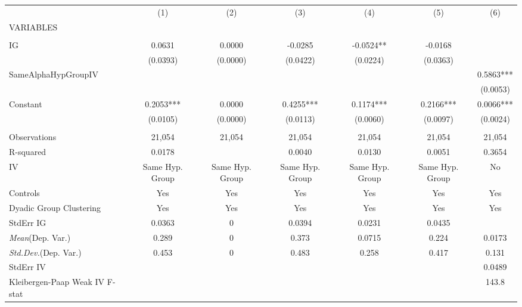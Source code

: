 \documentclass[]{article}
\begin{document}
\begin{tabular}{lcccccc} \hline
 & (1) & (2) & (3) & (4) & (5) & (6) \\
VARIABLES &  &  &  &  &  &  \\ \hline
 &  &  &  &  &  &  \\
IG & 0.0631 & 0.0000 & -0.0285 & -0.0524** & -0.0168 &  \\
 & (0.0393) & (0.0000) & (0.0422) & (0.0224) & (0.0363) &  \\
SameAlphaHypGroupIV &  &  &  &  &  & 0.5863*** \\
 &  &  &  &  &  & (0.0053) \\
Constant & 0.2053*** & 0.0000 & 0.4255*** & 0.1174*** & 0.2166*** & 0.0066*** \\
 & (0.0105) & (0.0000) & (0.0113) & (0.0060) & (0.0097) & (0.0024) \\
 &  &  &  &  &  &  \\
Observations & 21,054 & 21,054 & 21,054 & 21,054 & 21,054 & 21,054 \\
R-squared & 0.0178 &  & 0.0040 & 0.0130 & 0.0051 & 0.3654 \\
IV & Same Hyp. Group & Same Hyp. Group & Same Hyp. Group & Same Hyp. Group & Same Hyp. Group & No \\
Controls & Yes & Yes & Yes & Yes & Yes & Yes \\
Dyadic Group Clustering & Yes & Yes & Yes & Yes & Yes & Yes \\
StdErr IG & 0.0363 & 0 & 0.0394 & 0.0231 & 0.0435 &  \\
\textit{Mean}(Dep. Var.) & 0.289 & 0 & 0.373 & 0.0715 & 0.224 & 0.0173 \\
\textit{Std.Dev.}(Dep. Var.) & 0.453 & 0 & 0.483 & 0.258 & 0.417 & 0.131 \\
StdErr IV &  &  &  &  &  & 0.0489 \\
 Kleibergen-Paap Weak IV F-stat &  &  &  &  &  & 143.8 \\ \hline
\end{tabular}
\end{document}
